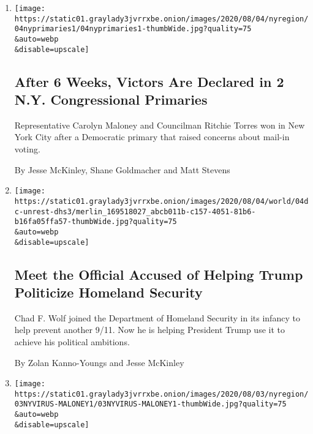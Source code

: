 \begin{enumerate}
\def\labelenumi{\arabic{enumi}.}
\item
  \href{/2020/08/04/nyregion/maloney-torres-ny-congressional-races.html}{}

  \texttt{[image: https://static01.graylady3jvrrxbe.onion/images/2020/08/04/nyregion/04nyprimaries1/04nyprimaries1-thumbWide.jpg?quality=75\\\&auto=webp\\\&disable=upscale]}

  \hypertarget{after-6-weeks-victors-are-declared-in-2-ny-congressional-primaries}{%
  \subsection{After 6 Weeks, Victors Are Declared in 2 N.Y.
  Congressional
  Primaries}\label{after-6-weeks-victors-are-declared-in-2-ny-congressional-primaries}}

  Representative Carolyn Maloney and Councilman Ritchie Torres won in
  New York City after a Democratic primary that raised concerns about
  mail-in voting.

  By Jesse McKinley, Shane Goldmacher and Matt Stevens
\item
  \href{/2020/08/04/us/politics/trump-homeland-security.html}{}

  \texttt{[image: https://static01.graylady3jvrrxbe.onion/images/2020/08/04/world/04dc-unrest-dhs3/merlin\_169518027\_abcb011b-c157-4051-81b6-b16fa05ffa57-thumbWide.jpg?quality=75\\\&auto=webp\\\&disable=upscale]}

  \hypertarget{meet-the-official-accused-of-helping-trump-politicize-homeland-security}{%
  \subsection{Meet the Official Accused of Helping Trump Politicize
  Homeland
  Security}\label{meet-the-official-accused-of-helping-trump-politicize-homeland-security}}

  Chad F. Wolf joined the Department of Homeland Security in its infancy
  to help prevent another 9/11. Now he is helping President Trump use it
  to achieve his political ambitions.

  By Zolan Kanno-Youngs and Jesse McKinley
\item
  \href{/2020/08/03/nyregion/nyc-congress-carolyn-maloney-ballots.html}{}

  \texttt{[image: https://static01.graylady3jvrrxbe.onion/images/2020/08/03/nyregion/03NYVIRUS-MALONEY1/03NYVIRUS-MALONEY1-thumbWide.jpg?quality=75\\\&auto=webp\\\&disable=upscale]}


\end{enumerate}
